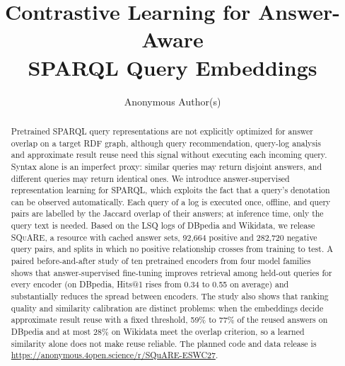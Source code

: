 \documentclass[runningheads]{llncs}
\newcommand{\squareds}{\textsc{SQuARE}}
\begin{document}
\title{Contrastive Learning for Answer-Aware\\SPARQL Query Embeddings}


\author{Anonymous Author(s)}

\maketitle

\begin{abstract}
Pretrained SPARQL query representations are not explicitly optimized for
answer overlap on a target RDF graph, although query recommendation,
query-log analysis and approximate result reuse need this signal without
executing each incoming query. Syntax alone is an imperfect proxy: similar queries may return disjoint answers, and different queries may
return identical ones. We introduce answer-supervised representation learning
for SPARQL, which exploits the fact that a query's denotation can be observed
automatically. Each query of a log is executed once, offline, and query pairs
are labelled by the Jaccard overlap of their answers; at inference time, only
the query text is needed. Based on the LSQ logs of DBpedia and Wikidata, we
release \squareds{}, a resource with cached answer sets, 92{,}664 positive and
282{,}720 negative query pairs, and splits in which no positive relationship
crosses from training to test. A paired before-and-after study of ten pretrained encoders from four model families shows that answer-supervised fine-tuning improves retrieval among held-out queries for every encoder (on DBpedia, Hits@1 rises from 0.34 to 0.55 on
average) and substantially reduces the spread between encoders. The study
also shows that ranking quality and similarity calibration are distinct
problems: when the embeddings decide approximate result reuse with a fixed
threshold, 59\% to 77\% of the reused answers on DBpedia and at most 28\% on
Wikidata meet the overlap criterion, so a learned similarity alone does not
make reuse reliable. The planned code and data release is \url{https://anonymous.4open.science/r/SQuARE-ESWC27}.

\end{abstract}
\end{document}
